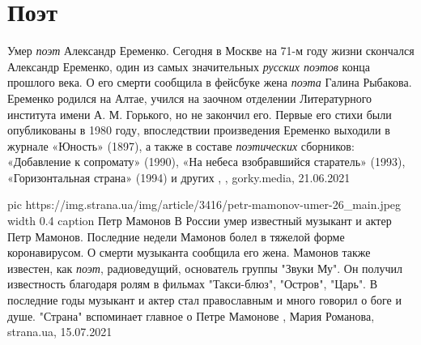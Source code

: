  
 
 
 
 
\chapter{Поэт}
\label{sec:slova.poet}

Умер \emph{поэт} Александр Еременко.  Сегодня в Москве на 71-м году жизни
скончался Александр Еременко, один из самых значительных \emph{русских поэтов}
конца прошлого века. О его смерти сообщила в фейсбуке жена \emph{поэта} Галина
Рыбакова.  Еременко родился на Алтае, учился на заочном отделении Литературного
института имени А.  М. Горького, но не закончил его. Первые его стихи были
опубликованы в 1980 году, впоследствии произведения Еременко выходили в журнале
«Юность» (1897), а также в составе \emph{поэтических} сборников: «Добавление к
сопромату» (1990), «На небеса взобравшийся старатель» (1993), «Горизонтальная
страна» (1994) и других
, 
, gorky.media, 21.06.2021

\ifcmt
  pic https://img.strana.ua/img/article/3416/petr-mamonov-umer-26_main.jpeg
  width 0.4
	caption Петр Мамонов 
\fi
В России умер известный музыкант и актер Петр Мамонов. Последние недели Мамонов
болел в тяжелой форме коронавирусом. О смерти музыканта сообщила его жена.
Мамонов также известен, как \emph{поэт}, радиоведущий, основатель группы "Звуки Му".
Он получил известность благодаря ролям в фильмах "Такси-блюз", "Остров",
"Царь".  В последние годы музыкант и актер стал православным и много говорил о
боге и душе. "Страна" вспоминает главное о Петре Мамонове
, 
Мария Романова, strana.ua, 15.07.2021
